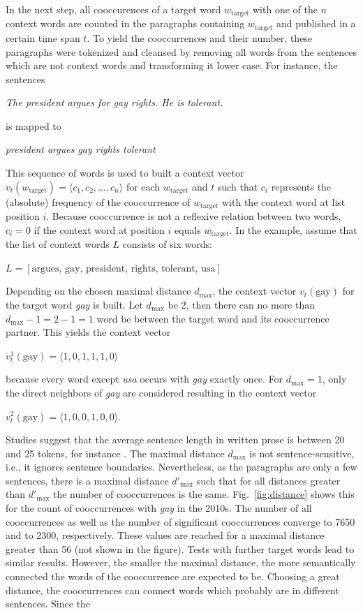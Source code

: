 \documentclass[10pt,a4paper,twocolumn]{scrartcl}
\begin{document}
In the next step, all cooccurences of a target word $w_\text{target}$ with one of the $n$ context words are counted in the paragraphs containing $w_\text{target}$ and published in a certain time span $t$. To yield the cooccurrences and their number, these paragraphs were tokenized and cleansed by removing all words from the sentences which are not context words and transforming it lower case. For instance, the sentences \begin{center}\textit{The president argues for gay rights. He is tolerant.}\end{center} is mapped to \begin{center}\textit{president argues gay rights tolerant}\end{center} This sequence of words is used to built a context vector $v_t(w_\text{target}) = \langle c_1, c_2, \ldots, c_n\rangle$ for each $w_\text{target}$ and $t$ such that $c_i$ represents the (absolute) frequency of the cooccurrence of $w_\text{target}$ with the context word at list position $i$. Because cooccurrence is not a reflexive relation between two words, $c_i = 0$ if the context word at position $i$ equals $w_\text{target}$. In the example, assume that the list of context words $L$ consists of six words: \begin{center}$L =  [\text{argues, gay, president, rights, tolerant, usa}]$\end{center} Depending on the chosen maximal distance $d_\text{max}$, the context vector $v_t(\text{gay})$ for the target word \textit{gay} is built. Let $d_\text{max}$ be 2, then there can no more than $d_\text{max} - 1 = 2 - 1 = 1$ word be between the target word and its cooccurrence partner. This yields the context vector \begin{center}$v_t^1(\text{gay}) = \langle 1, 0, 1, 1, 1, 0\rangle$\end{center} because every word except \textit{usa} occurs with \textit{gay} exactly once. For $d_\text{max} = 1$, only the direct neighbors of \textit{gay} are considered resulting in the context vector \begin{center}$v_t^2(\text{gay}) = \langle 1, 0, 0, 1, 0, 0\rangle$.\end{center} Studies suggest that the average sentence length in written prose is between 20 and 25 tokens, for instance \citep{Sichel:1974}. The maximal distance $d_\text{max}$ is not sentence-sensitive, i.e., it ignores sentence boundaries. Nevertheless, as the paragraphs are only a few sentences, there is a maximal distance $d'_\text{max}$ such that for all distances greater than $d'_\text{max}$ the number of cooccurrences is the same. Fig.~\ref{fig:distance} shows this for the count of cooccurrences with \textit{gay} in the 2010s. The number of all cooccurrences as well as the number of significant cooccurrences converge to 7650 and to 2300, respectively. These values are reached for a maximal distance greater than 56 (not shown in the figure). Tests with further target words lead to similar results. However, the smaller the maximal distance, the more semantically connected the words of the cooccurrence are expected to be. Choosing a great distance, the cooccurrences can connect words which probably are in different sentences. Since the 
\end{document}
